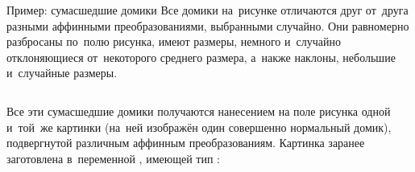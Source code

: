 \begin{frame}{Пример: сумасшедшие домики}
Все домики на~рисунке отличаются друг от~друга разными аффинными
преобразованиями, выбранными случайно. Они равномерно разбросаны по~полю
рисунка, имеют размеры, немного и~случайно отклоняющиеся от~некоторого среднего
размера, а~накже наклоны, небольшие и~случайные размеры.

\bigskip

\begin{columns}[onlytextwidth]
Все эти сумасшедшие домики получаются нанесением на поле рисунка одной и~той~же
картинки (на~ней изображён один совершенно нормальный домик), подвергнутой
различным аффинным преобразованиям. Картинка заранее заготовлена в~переменной
, имеющей тип :
\centerline{}
\end{columns}
\end{frame}

